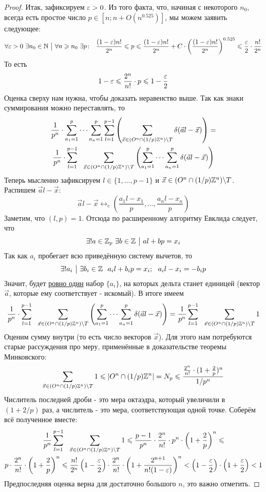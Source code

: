 \begin{proof}
	Итак, зафиксируем $\varepsilon > 0$. Из того факта, что, начиная с некоторого $n_0$, всегда есть простое число $p \in [n; n + O(n^{0.525})]$, мы можем заявить следующее:
	\[
		\forall \eps > 0\ \exists n_0 \in \N \such \forall n \ge n_0\ \exists p \colon\ \ \frac{(1 - \eps)n!}{2^n} \le p \le \frac{(1 - \eps)n!}{2^n} + C \cdot \left(\frac{(1 - \eps) n!}{2^n}\right)^{0.525} \le \frac{\eps}{2} \cdot \frac{n!}{2^n}
	\]
	То есть
	\[
		1 - \varepsilon \leqslant \frac{2^n}{n!} \cdot p \leqslant 1 - \frac{\varepsilon}{2}
	\]
	Оценка сверху нам нужна, чтобы доказать неравенство выше. Так как знаки суммирования можно переставлять, то
	\begin{multline*}
		\frac{1}{p^n} \cdot \sum\limits_{a_1 = 1}^p \cdots \sum\limits_{a_n = 1}^p \sum\limits_{l = 1}^{p - 1} \left(\sum\limits_{\vec{x} \in (O^n \cap (1/p)\mathbb{Z}^n) \backslash T} \delta(\vec{a} l - \vec{x})\right) =
		\\
		\frac{1}{p^n} \cdot \sum\limits_{l = 1}^{p - 1}\ \ \sum\limits_{\vec{x} \in (O^n \cap (1 / p)\mathbb{Z}^n) \backslash T} \left(\sum\limits_{a_1 = 1}^p \cdots \sum\limits_{a_n = 1}^p \delta(\vec{a}l - \vec{x})\right)
	\end{multline*}
	Теперь мысленно зафиксируем $l \in \{1, \ldots, p - 1\}$ и $\vec{x} \in (O^n \cap (1 / p)\mathbb{Z}^n) \backslash T$. Распишем $\vec{a}l - \vec{x}$:
	\[
		\vec{a}l - \vec{x} \leftrightarrow_e \left(\frac{a_1 l - x_1}{p}, \ldots, \frac{a_n l - x_n}{p}\right)
	\]
	Заметим, что $(l, p) = 1$. Отсюда по расширенному алгоритму Евклида следует, что
	\[
		\exists! a \in \mathbb{Z}_p\ \exists b \in \mathbb{Z} \ \big|\  al + bp = x_i
	\]
	Так как $a_i$ пробегает всю приведённую систему вычетов, то
	\[
		\exists! a_i \ \big|\  \exists b_i \in \mathbb{Z}\ \ a_i l + b_i p = x_i;\ \ a_i l - x_i = -b_i p
	\]
	Значит, будет \underline{ровно один} набор $\{a_i\}$, на которых дельта станет единицей (вектор $\vec{a}$, которые ему соответствует - искомый). В итоге имеем
	\[
		\frac{1}{p^n} \cdot \suml_{l = 1}^{p - 1}\ \ \suml_{\vec{x} \in (O^n \cap (1 / p)\Z^n) \bs T} \left(\suml_{a_1 = 1}^p \cdots \suml_{a_n = 1}^p \delta(\vec{a}l - \vec{x})\right) = \frac{1}{p^n} \suml_{l = 1}^{p - 1}\ \ \suml_{\vec{x} \in (O^n \cap (1 / p)\Z^n) \bs T} 1
	\]
	Оценим сумму внутри (то есть число векторов $\vec{x}$). Для этого нам потребуются старые рассуждения про меру, применённые в доказательстве теоремы Минковского:
	\[
		\sum\limits_{\vec{x} \in (O^n \cap (1 / p)\mathbb{Z}^n) \backslash T} 1 \leqslant |O^n \cap (1 / p)\mathbb{Z}^n| = N_p \leqslant \frac{\frac{2^n}{n!} \cdot (1 + \frac{2}{p})^n}{1/p^n}
	\]
	Числитель последней дроби - это мера октаэдра, который увеличили в $(1 + 2/p)$ раз, а числитель - это мера, соответствующая одной точке. Соберём всё полученное вместе:
	\begin{multline*}
		\frac{1}{p^n} \sum\limits_{l = 1}^{p - 1}\ \ \sum\limits_{\vec{x} \in (O^n \cap (1 / p)\mathbb{Z}^n) \backslash T} 1 \leqslant \frac{p - 1}{p^n} \cdot \frac{2^n}{n!} \cdot p^n \cdot \left(1 + \frac{2}{p}\right)^n \leqslant
		\\
		p \cdot \frac{2^n}{n!} \cdot \left(1 + \frac{2}{p}\right)^n \leqslant \frac{n!}{2^n} \left(1 - \frac{\varepsilon}{2}\right) \cdot \frac{2^n}{n!} \cdot \left(1 + \frac{2^{n + 1}}{n! (1 - \varepsilon)}\right)^n < \left(1 - \frac{\varepsilon}{2}\right) \cdot \left(1 + \frac{\varepsilon}{2}\right) < 1
	\end{multline*}
	Предпоследняя оценка верна для достаточно большого $n$, это важно отметить. 
\end{proof}